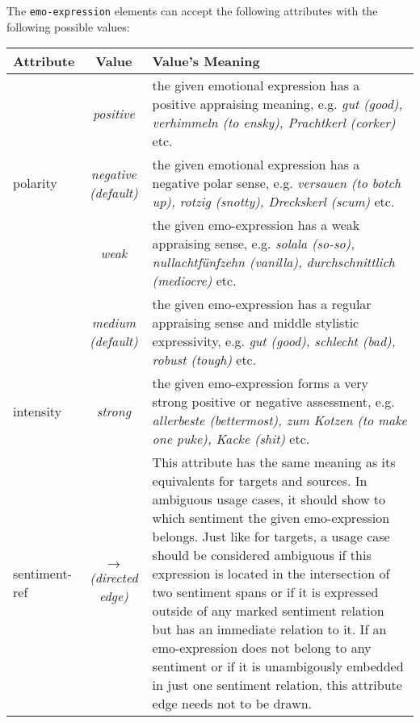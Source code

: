 \documentclass[11pt,a4paper]{article}
\newlength\clmnwidth
\begin{document}
The \texttt{emo-expression} elements can accept the following
attributes with the following possible values:
\begin{center}
  \begin{tabular}{|l|c|p{\clmnwidth}|}\hline\label{tbl-emo}
    Attribute & Value & Value's Meaning\\\hline

    & \textit{positive} & the given emotional expression has a
    positive appraising meaning, e.g. \textit{gut (good), verhimmeln
      (to ensky), Prachtkerl (corker)} etc.\\\cline{2-3}

    \multirow{-2}{*}{polarity} & \textit{negative\newline(default)} &
    the given emotional expression has a negative polar sense,
    e.g. \textit{versauen (to botch up), rotzig (snotty), Dreckskerl
      (scum)} etc.\\\hline


    & \textit{weak} & the given emo-expression has a weak appraising
    sense, e.g. \textit{solala (so-so), nullachtf\"unfzehn (vanilla),
      durchschnittlich (mediocre)} etc.\\\cline{2-3}

    & \textit{medium\newline(default)} & the given emo-expression has
    a regular appraising sense and middle stylistic expressivity,
    e.g. \textit{gut (good), schlecht (bad), robust (tough)}
    etc.\\\cline{2-3}

    \multirow{-3}{*}{intensity} & \textit{strong} & the given
    emo-expression forms a very strong positive or negative
    assessment, e.g. \textit{allerbeste (bettermost), zum Kotzen (to
      make one puke), Kacke (shit)} etc.\\\hline


    sentiment-ref & \textit{$\longrightarrow$\newline(directed edge)}
    & This attribute has the same meaning as its equivalents for
    targets and sources.  In ambiguous usage cases, it should show to
    which sentiment the given emo-expression belongs.  Just like for
    targets, a usage case should be considered ambiguous if this
    expression is located in the intersection of two sentiment spans
    or if it is expressed outside of any marked sentiment relation but
    has an immediate relation to it.  If an emo-expression does not
    belong to any sentiment or if it is unambigously embedded in just
    one sentiment relation, this attribute edge needs not to be
    drawn.\\\hline


\end{tabular}
\end{center}
\end{document}
